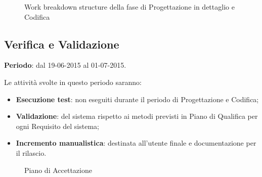 {{	\begin{landscape}
		\thispagestyle{empty}
		\begin{figure}[H]
			\parbox[c][\textwidth][s]{\linewidth}{
			\centering
			\vspace*{\fill}
			\vspace*{\fill}
			\label{fig:wbsCodifica}
			\caption{Work breakdown structure della fase di Progettazione in dettaglio e Codifica}}
		\end{figure}
	\end{landscape}
}

\newpage
\subsection{Verifica e Validazione}{
	\textbf{Periodo}: dal 19-06-2015 al 01-07-2015.
	
	Le attività svolte in questo periodo saranno:
	\begin{itemize}
		\item \textbf{Esecuzione test}: non eseguiti durante il periodo di Progettazione e Codifica;
		\item \textbf{Validazione}: del sistema rispetto ai metodi previsti in Piano di Qualifica per ogni Requisito del sistema;
		\item \textbf{Incremento manualistica}: destinata all'utente finale e documentazione per il rilascio.
	\end{itemize}

	\begin{landscape}
		\thispagestyle{empty}	
		\begin{figure}[H]
			\parbox[c][\textwidth][s]{\linewidth}{
			\centering
			\vspace*{\fill}
			\vspace*{\fill}
			\label{fig:pianoaccettazione}
			\caption{Piano di Accettazione}}
		\end{figure}
	\end{landscape}
	
}}
